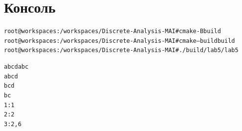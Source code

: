 \pagebreak

\section{Консоль}

\begin{alltt}
root@workspaces:/workspaces/Discrete-Analysis-MAI# cmake -B build
root@workspaces:/workspaces/Discrete-Analysis-MAI# cmake --build build
root@workspaces:/workspaces/Discrete-Analysis-MAI# ./build/lab5/lab5

abcdabc
abcd
bcd
bc
1: 1
2: 2
3: 2, 6

\end{alltt}

\pagebreak